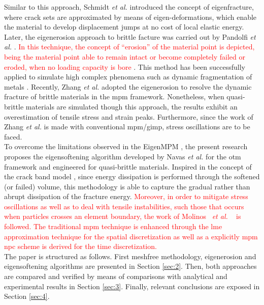 \message{ !name(2020_EFM_MPM_Eigensoftening.tex)}\documentclass[preprint,12pt,a4paper]{elsarticle}
\newcommand{\etal}{
  \textit{et al.}
}
\newcommand{\PNA}[1]{
  \textcolor{red}{{#1}}
}
\begin{document}
Similar to this approach, Schmidt {\it et al.}
\cite{Schmidt_2009} introduced the concept of eigenfracture, where
crack sets are approximated by means of eigen-deformations, which
enable the material to develop displacement jumps at no cost of local
elastic energy. Later, the eigenerosion approach to brittle facture
was carried out by Pandolfi {\it et al.}
\cite{Pandolfi_2012,Pandolfi_2013}. \PNA{In this technique, the concept of ``erosion'' of
the material point is depicted, being the material point able to remain intact or become completely failed or eroded, when no loading
capacity is bore}. This method has been successfully applied to simulate high
complex phenomena such as dynamic fragmentation of metals
\cite{Li_2015}. Recently, Zhang {\it et al.}
\cite{Zhang_EE_2020} adopted the eigenerosion to resolve the dynamic
fracture of brittle materials in the \acrshort{mpm}
framework. Nonetheless, when quasi-brittle materials are simulated
though this approach, the results exhibit an overestimation of tensile
stress and strain peaks. Furthermore, since the work of Zhang {\it et al.}
\cite{Zhang_EE_2020} is made with conventional \acrshort{mpm}/\acrshort{gimp}, stress oscillations are to be faced.\\

To overcome the limitations observed in the EigenMPM
\cite{Zhang_EE_2020}, the present research proposes the eigensoftening
algorithm developed by Navas {\it et al.}
\cite{Navas_2017_ES,Navas2018a} for the \acrshort{otm} framework and
engineered for quasi-brittle materials. Inspired in the concept of the
crack band model \cite{Bazant83}, since energy dissipation is performed through the softened (or failed) volume, this methodology is able to capture the gradual rather than abrupt
dissipation of the fracture energy. \PNA{Moreover, in order to mitigate stress
oscillations as well as to deal with tensile instabilities, such those that
occurs when particles crosses an element boundary, the work of Molinos~\etal~\cite{Molinos2020} is followed. The traditional \acrshort{mpm} technique is enhanced through the \acrfull{lme} approximation technique
\cite{Arroyo2006} for the spatial discretization as well as a explicitly \acrshort{mpm} \acrfull{npc} scheme is derived for the time discretization.}\\

The paper is structured as follows. First meshfree methodology,
eigenerosion and eigensoftening algorithms are presented in Section
\ref{sec:2}. Then, both approaches are compared and verified by means of
comparisons with analytical and experimental results in Section
\ref{sec:3}. Finally, relevant conclusions are exposed in Section \ref{sec:4}.
\end{document}
